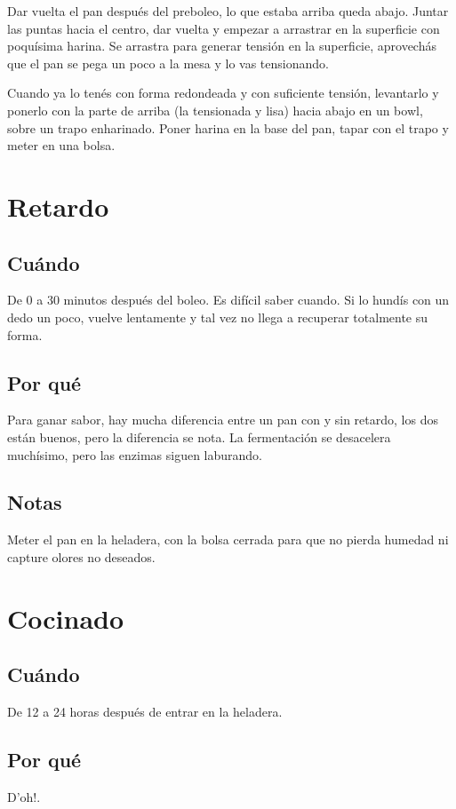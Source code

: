 \documentclass[10pt,a4paper]{article}
\begin{document}
Dar vuelta el pan después del preboleo, lo que estaba arriba queda abajo. Juntar
las puntas hacia el centro, dar vuelta y empezar a arrastrar en la superficie
con poquísima harina. Se arrastra para generar tensión en la superficie,
aprovechás que el pan se pega un poco a la mesa y lo vas tensionando.

Cuando ya lo tenés con forma redondeada y con suficiente tensión, levantarlo y
ponerlo con la parte de arriba (la tensionada y lisa) hacia abajo en un bowl,
sobre un trapo enharinado. Poner harina en la base del pan, tapar con el trapo y
meter en una bolsa.

\section{Retardo}
\subsection*{Cuándo}
De 0 a 30 minutos después del boleo. Es difícil saber cuando. Si lo hundís con
un dedo un poco, vuelve lentamente y tal vez no llega a recuperar totalmente su forma.
\subsection*{Por qué}
Para ganar sabor, hay mucha diferencia entre un pan con y sin
retardo, los dos están buenos, pero la diferencia se nota. La fermentación se
desacelera muchísimo, pero las enzimas siguen laburando.

\subsection*{Notas}
Meter el pan en la heladera, con la bolsa cerrada para que no pierda humedad ni
capture olores no deseados.

\section{Cocinado}
\subsection*{Cuándo}
De 12 a 24 horas después de entrar en la heladera.
\subsection*{Por qué}
D'oh!.
\end{document}
